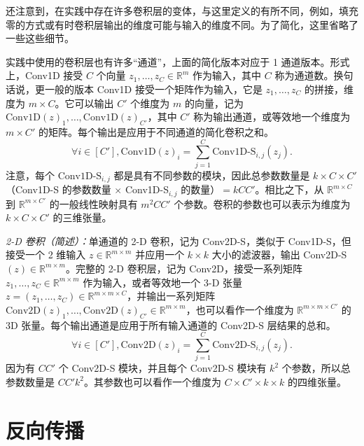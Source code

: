 还注意到，在实践中存在许多卷积层的变体，与这里定义的有所不同，例如，填充零的方式或有时卷积层输出的维度可能与输入的维度不同。为了简化，这里省略了一些这些细节。

实践中使用的卷积层也有许多“通道”，上面的简化版本对应于 1 通道版本。形式上，Conv1D 接受 $C$ 个向量 $z_1, \ldots, z_C \in \mathbb{R}^m$ 作为输入，其中 $C$ 称为通道数。换句话说，更一般的版本 Conv1D 接受一个矩阵作为输入，它是 $z_1, \ldots, z_C$ 的拼接，维度为 $m \times C$。它可以输出 $C'$ 个维度为 $m$ 的向量，记为 $\text{Conv1D}(z)_1, \ldots, \text{Conv1D}(z)_{C'}$，其中 $C'$ 称为输出通道，或等效地一个维度为 $m \times C'$ 的矩阵。每个输出是应用于不同通道的简化卷积之和。
\begin{equation}
    \forall i \in [C'], \text{Conv1D}(z)_i = \sum_{j=1}^C \text{Conv1D-S}_{i,j}(z_j). \label{eq:7.50}
\end{equation}
注意，每个 $\text{Conv1D-S}_{i,j}$ 都是具有不同参数的模块，因此总参数数量是 $k \times C \times C'$（Conv1D-S 的参数数量 $\times$ Conv1D-S$_{i,j}$ 的数量）$= kCC'$。相比之下，从 $\mathbb{R}^{m \times C}$ 到 $\mathbb{R}^{m \times C'}$ 的一般线性映射具有 $m^2CC'$ 个参数。卷积的参数也可以表示为维度为 $k \times C \times C'$ 的三维张量。

\vspace{0.5em}
\noindent\textit{2-D 卷积（简述）：}单通道的 2-D 卷积，记为 Conv2D-S，类似于 Conv1D-S，但接受一个 2 维输入 $z \in \mathbb{R}^{m \times m}$ 并应用一个 $k \times k$ 大小的滤波器，输出 Conv2D-S$(z) \in \mathbb{R}^{m \times m}$。完整的 2-D 卷积层，记为 Conv2D，接受一系列矩阵 $z_1, \ldots, z_C \in \mathbb{R}^{m \times m}$ 作为输入，或者等效地一个 3-D 张量 $z = (z_1, \ldots, z_C) \in \mathbb{R}^{m \times m \times C}$，并输出一系列矩阵 $\text{Conv2D}(z)_1, \ldots, \text{Conv2D}(z)_{C'} \in \mathbb{R}^{m \times m}$，也可以看作一个维度为 $\mathbb{R}^{m \times m \times C'}$ 的 3D 张量。每个输出通道是应用于所有输入通道的 Conv2D-S 层结果的总和。
\begin{equation}
    \forall i \in [C'], \text{Conv2D}(z)_i = \sum_{j=1}^C \text{Conv2D-S}_{i,j}(z_j). \label{eq:7.51}
\end{equation}
因为有 $CC'$ 个 Conv2D-S 模块，并且每个 Conv2D-S 模块有 $k^2$ 个参数，所以总参数数量是 $CC'k^2$。其参数也可以看作一个维度为 $C \times C' \times k \times k$ 的四维张量。

\section{反向传播}\label{sec:7.4}

